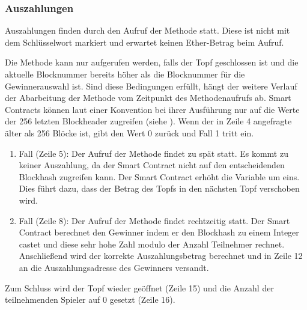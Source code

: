 \subsubsection{Auszahlungen}\label{sssec:eth_nbrOfMissedPayouts}
Auszahlungen finden durch den Aufruf der  Methode statt. Diese ist nicht mit dem Schlüsselwort  markiert und erwartet keinen Ether-Betrag beim Aufruf.

Die Methode kann nur aufgerufen werden, falls der Topf geschlossen ist und die aktuelle Blocknummer bereits höher als die Blocknummer für die Gewinnerauswahl ist. Sind diese Bedingungen erfüllt, hängt der weitere Verlauf der Abarbeitung der  Methode vom Zeitpunkt des Methodenaufrufs ab. Smart Contracts können laut einer Konvention bei ihrer Ausführung nur auf die Werte der 256 letzten Blockheader zugreifen (siehe \cite{doc_solidity_global_var}). Wenn der in Zeile 4 angefragte  älter als 256 Blöcke ist, gibt  den Wert 0 zurück und Fall 1 tritt ein.
\begin{enumerate}
\item Fall (Zeile 5): Der Aufruf der  Methode findet zu spät statt. Es kommt zu keiner Auszahlung, da der Smart Contract nicht auf den entscheidenden Blockhash zugreifen kann. Der Smart Contract erhöht die  Variable um eins. Dies führt dazu, dass der Betrag des Topfs in den nächsten Topf verschoben wird. 
\item Fall (Zeile 8): Der Aufruf der  Methode findet rechtzeitig statt. Der Smart Contract berechnet den Gewinner indem er den Blockhash zu einem Integer castet und diese sehr hohe Zahl modulo der Anzahl Teilnehmer rechnet. Anschließend wird der korrekte Auszahlungsbetrag berechnet und in Zeile 12 an die Auszahlungsadresse des Gewinners versandt.
\end{enumerate}
Zum Schluss wird der Topf wieder geöffnet (Zeile 15) und die Anzahl der teilnehmenden Spieler auf 0 gesetzt (Zeile 16).

